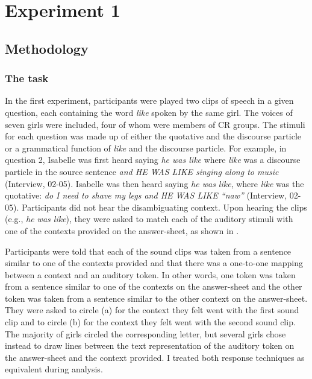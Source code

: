 \section{Experiment 1}\label{exp1} 

\subsection{Methodology}

\subsubsection{The task}

In the first experiment, participants were played two clips of speech in a given question, each containing the word \textit{like} spoken by the same girl. The voices of seven girls were included, four of whom were members of CR groups. The stimuli for each question was made up of either the quotative and the discourse particle or a grammatical function of \textit{like} and the discourse particle. For example, in question 2, Isabelle was first heard saying \textit{he was like} where \textit{like} was a discourse particle in the source sentence \textit{and HE WAS LIKE singing along to music} (Interview, 02-05). Isabelle was then heard saying \textit{he was like}, where \textit{like} was the quotative: \textit{do I need to shave my legs and HE WAS LIKE ``naw''} (Interview, 02-05). Participants did not hear the disambiguating context. Upon hearing the clips (e.g., \textit{he was like}), they were asked to match each of the auditory stimuli with one of the contexts provided on the answer-sheet, as shown in . 



Participants were told that each of the sound clips was taken from a sentence similar to one of the contexts provided and that there was a one-to-one mapping between a context and an auditory token. In other words, one token was taken from a sentence similar to one of the contexts on the answer-sheet and the other token was taken from a sentence similar to the other context on the answer-sheet. They were asked to circle (a) for the context they felt went with the first sound clip and to circle (b) for the context they felt went with the second sound clip. The majority of girls circled the corresponding letter, but several girls chose instead to draw lines between the text representation of the auditory token on the answer-sheet and the context provided. I treated both response techniques as equivalent during analysis.

